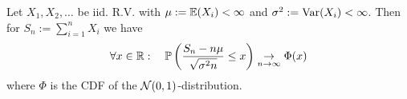 \begin{theorem*}
  Let \(X_1, X_2, \ldots\) be iid. R.V. with \(\mu := \mathbb{E}(X_i) < \infty\) and \(\sigma^2 := \operatorname{Var}(X_i) < \infty\). Then for \(S_n := \sum_{i=1}^n X_i\) we have
  \[\forall x \in \mathbb{R}: \quad \mathbb{P}\left(\frac{S_n - n \mu}{\sqrt{\sigma^2n}} \leq x\right) \underset{n \to \infty}{\to} \Phi(x)\]
  where \(\Phi\) is the CDF of the \(\operatorname{\mathcal{N}}(0, 1)\)-distribution.
\end{theorem*}
